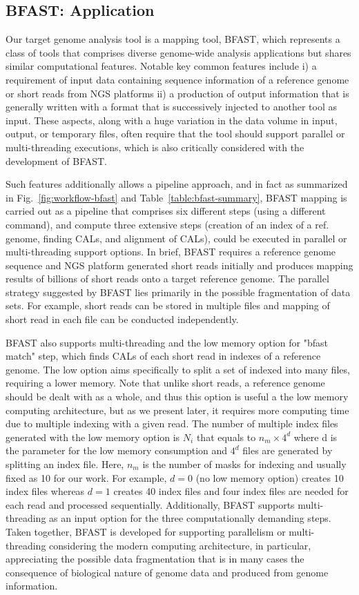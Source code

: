 \documentclass{acm_proc_article-sp}
\begin{document}
\subsection{BFAST: Application}
Our target genome analysis tool is a mapping tool,
BFAST\cite{bfast2009,bfast2009b}, which represents a class of tools
that comprises diverse genome-wide analysis applications but shares
similar computational features.  Notable key common features include i) a
requirement of input data containing sequence information of a
reference genome or short reads from NGS platforms ii) a production of
output information that is generally written with a format that is
successively injected to another tool as input.  These aspects, along
with a huge variation in the data volume in input, output, or
temporary files, often require that the tool should support parallel
or multi-threading executions, which is also critically considered with the development of BFAST\cite{bfast2009}.

Such features additionally allows a pipeline approach, and in fact as summarized in Fig.~\ref{fig:workflow-bfast} and
Table~\ref{table:bfast-summary}, BFAST mapping is carried out as a pipeline that
comprises six different steps (using a different command), and compute
three extensive steps (creation of an index of a ref. genome, finding CALs, and alignment of CALs), could be executed in parallel or multi-threading support options.  In brief, BFAST requires a reference genome sequence
and NGS platform generated short reads initially and produces mapping results of
billions of short reads onto a target reference genome.  The parallel strategy suggested by BFAST lies primarily in the possible fragmentation of data sets.  For example, short reads can be stored in multiple files and mapping of short read in each file can be conducted independently. 

BFAST also supports multi-threading and the low memory option for
"bfast match" step, which finds CALs of each short read in indexes of a reference genome.  The low option aims specifically to split a set of indexed into many files, requiring a lower memory.  Note that unlike short reads, a reference genome should be dealt with as a whole, and thus this option is useful a the low memory computing architecture, but as we present later, it requires more computing time due to multiple indexing with a given read.  The number of multiple index files generated with the low memory option is $N_i$ that equals to $n_m \times 4^d$ where d is the parameter
for the low memory consumption and $4^d$ files are generated by
splitting an index file.  Here, $n_m$ is the number of masks for indexing
and usually fixed as 10 for our work.  For example, $d=0$ (no low memory option) creates 10 index files whereas $d=1$ creates 40 index files and four index files are needed for each read and processed sequentially.   Additionally, BFAST supports multi-threading as an input option for the three computationally demanding steps.  Taken together, BFAST is developed for supporting parallelism or multi-threading considering the modern computing architecture, in particular, appreciating the possible data fragmentation that is in many cases the consequence of biological nature of genome data and produced from genome information. 
\end{document}
